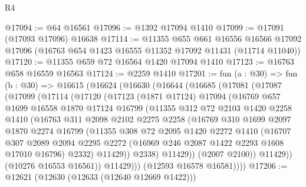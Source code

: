\begin{lexlean}{R4}
\begin{coremodule}
@17094 := @64 @16561
@17096 := @1392 @17094 @1410
@17099 := @17091 (@17093 @17096) @16638
@17114 := @11355
    @655
    @661
    @16556
    @16566
    @17092
    @17096
    (@16763 @654 @1423 @16555 @11352 @17092 @11431 (@11714 @11040))
@17120 := @11355 @659 @72 @16564 @1420 @17094 @1410
@17123 := @16763 @658 @16559 @16563
@17124 := @2259 @1410
@17201 := fun (a : @30) =>
  fun (b : @30) =>
  @16615
    (@16624
      (@16630
        (@16644
          (@16685
            (@17081
              (@17087
                (@17099
                  (@17114
                    (@17120
                      (@17123
                        (@1871 @17124)
                        @17094
                        (@16769
                          @657
                          @1699
                          @16558
                          @1870
                          @17124
                          @16799
                          (@11355
                            @312
                            @72
                            @2103
                            @1420
                            @2258
                            @1410
                            (@16763
                              @311
                              @2098
                              @2102
                              @2275
                              @2258
                              (@16769
                                @310
                                @1699
                                @2097
                                @1870
                                @2274
                                @16799
                                (@11355
                                  @308
                                  @72
                                  @2095
                                  @1420
                                  @2272
                                  @1410
                                  (@16707
                                    @307
                                    @2089
                                    @2094
                                    @2295
                                    @2272
                                    (@16969 @246 @2087 @1422 @2293 @1608 @17010 @16796)
                                    @2332)
                                  @11429))
                              @2338)
                            @11429))
                        (@2007 @2100))
                      @11429))
                  (@10276 @16553 @16561))
                @11429)))
          (@12593 @16578 @16581))))
@17206 := @12621 (@12630 (@12633 (@12640 @12669 @1422)))

\end{coremodule}
\end{lexlean}
